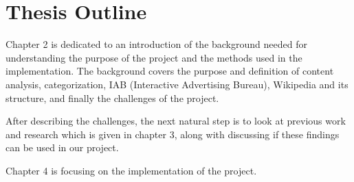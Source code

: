 \section{Thesis Outline}
Chapter 2 is dedicated to an introduction of the background needed for understanding the purpose of the project and the methods used in the implementation. The background covers the purpose and definition of content analysis, categorization, IAB (Interactive Advertising Bureau), Wikipedia and its structure, and finally the challenges of the project. 

After describing the challenges, the next natural step is to look at previous work and research which is given in chapter 3, along with discussing if these findings can be used in our project. 

Chapter 4 is focusing on the implementation of the project. 